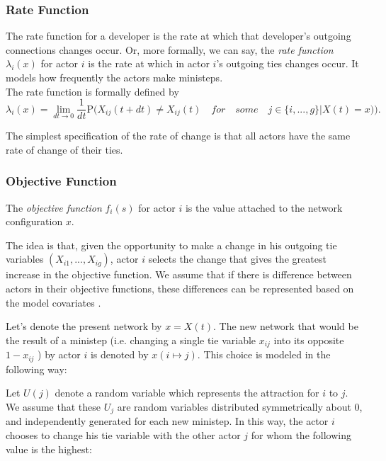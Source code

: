 \documentclass[11pt]{report}
\begin{document}
\subsubsection{Rate Function}

The rate function for a developer is the rate at which that developer's outgoing connections changes occur. Or, more formally, we can say, the \textit{rate function} $\lambda_i(x)$ for actor $i$ is the rate at which in actor $i$'s outgoing ties changes occur. It models how frequently the actors make ministeps.\\
The rate function is formally defined \cite{Snijders2004} by
\begin{equation}
\lambda_i(x) = \lim_{dt \to 0} \frac{1}{dt} \mathrm {P} \big({X_{ij}(t + dt) \neq X_{ij}(t) \quad for \quad some \quad j \in \{i, ..., g\} | X(t) = x)}\big).
\end{equation}

The simplest specification of the rate of change is that all actors have the same rate of change of their ties. 

\subsubsection{Objective Function}

The \textit{objective function} $f_i(s)$ for actor $i$ is the value attached to the network configuration $x$. 

The idea is that, given the opportunity to make a change in his outgoing tie variables $(X_{i1},...,X_{ig})$, actor $i$ selects the change that gives the greatest increase in the objective function. We assume that if there is difference between actors in their objective functions, these differences can be represented based on the model covariates \cite{Snijders2004}. 

Let's denote the present network by $x = X(t)$. The new network that would be the result of a ministep (i.e. changing a single tie variable $x_{ij}$ into its opposite $1 - x_{ij}$ ) by actor $i$ is denoted by $x(i \mapsto j)$. This choice is modeled in the following way: 

Let $U(j)$ denote a random variable which represents the attraction for $i$ to $j$. We assume that these $U_j$ are random variables distributed symmetrically about 0, and independently generated for each new ministep. In this way, the actor $i$ chooses to change his tie variable with the other actor $j$ for whom the following value \cite{Snijders2004} is the highest:
\end{document}
